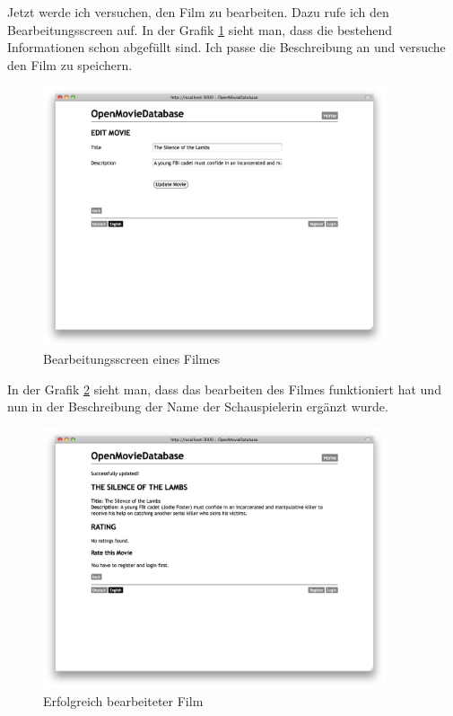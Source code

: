\clearpage

Jetzt werde ich versuchen, den Film zu bearbeiten. Dazu rufe ich den Bearbeitungsscreen
auf. In der Grafik \ref{test_movie_03} sieht man, dass die bestehend Informationen
schon abgefüllt sind. Ich passe die Beschreibung an und versuche den Film
zu speichern.

\begin{figure}[ht]
    \begin{center}
        \includegraphics[width=0.9\textwidth,angle=0]{./bilder/tests/test_movie_03.png}
        \caption{Bearbeitungsscreen eines Filmes}
        \label{test_movie_03}
    \end{center}
\end{figure}

In der Grafik \ref{test_movie_04} sieht man, dass das bearbeiten des Filmes
funktioniert hat und nun in der Beschreibung der Name der Schauspielerin ergänzt
wurde.

\begin{figure}[ht]
    \begin{center}
        \includegraphics[width=0.9\textwidth,angle=0]{./bilder/tests/test_movie_04.png}
        \caption{Erfolgreich bearbeiteter Film}
        \label{test_movie_04}
    \end{center}
\end{figure}

